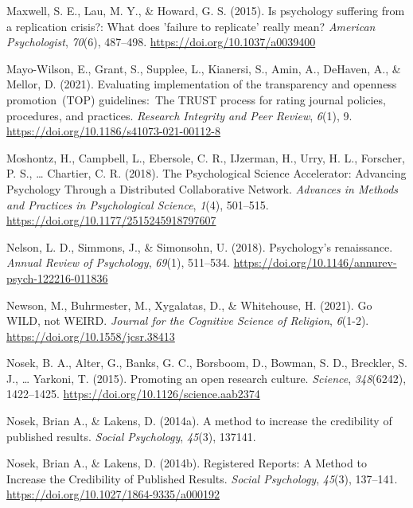 \documentclass[
  man,floatsintext]{apa6}
\newlength{\cslhangindent}
\newlength{\cslentryspacingunit} %
\newenvironment{CSLReferences}[2] %
 {%
  \setlength{\parindent}{0pt}
  \ifodd #1
  \let\oldpar\par
  \def\par{\hangindent=\cslhangindent\oldpar}
  \fi
  \setlength{\parskip}{#2\cslentryspacingunit}
 }%
 {}
\begin{document}
\begin{CSLReferences}{1}{0}
\leavevmode{}%
Maxwell, S. E., Lau, M. Y., \& Howard, G. S. (2015). Is psychology suffering from a replication crisis?: What does 'failure to replicate' really mean? \emph{American Psychologist}, \emph{70}(6), 487--498. \url{https://doi.org/10.1037/a0039400}

\leavevmode{}%
Mayo-Wilson, E., Grant, S., Supplee, L., Kianersi, S., Amin, A., DeHaven, A., \& Mellor, D. (2021). Evaluating implementation of the transparency and openness promotion~(TOP) guidelines:~The TRUST process for rating journal policies, procedures, and practices. \emph{Research Integrity and Peer Review}, \emph{6}(1), 9. \url{https://doi.org/10.1186/s41073-021-00112-8}

\leavevmode{}%
Moshontz, H., Campbell, L., Ebersole, C. R., IJzerman, H., Urry, H. L., Forscher, P. S., \ldots{} Chartier, C. R. (2018). The Psychological Science Accelerator: Advancing Psychology Through a Distributed Collaborative Network. \emph{Advances in Methods and Practices in Psychological Science}, \emph{1}(4), 501--515. \url{https://doi.org/10.1177/2515245918797607}

\leavevmode{}%
Nelson, L. D., Simmons, J., \& Simonsohn, U. (2018). Psychology's renaissance. \emph{Annual Review of Psychology}, \emph{69}(1), 511--534. \url{https://doi.org/10.1146/annurev-psych-122216-011836}

\leavevmode{}%
Newson, M., Buhrmester, M., Xygalatas, D., \& Whitehouse, H. (2021). Go WILD, not WEIRD. \emph{Journal for the Cognitive Science of Religion}, \emph{6}(1-2). \url{https://doi.org/10.1558/jcsr.38413}

\leavevmode{}%
Nosek, B. A., Alter, G., Banks, G. C., Borsboom, D., Bowman, S. D., Breckler, S. J., \ldots{} Yarkoni, T. (2015). Promoting an open research culture. \emph{Science}, \emph{348}(6242), 1422--1425. \url{https://doi.org/10.1126/science.aab2374}

\leavevmode{}%
Nosek, Brian A., \& Lakens, D. (2014a). A method to increase the credibility of published results. \emph{Social Psychology}, \emph{45}(3), 137141.

\leavevmode{}%
Nosek, Brian A., \& Lakens, D. (2014b). Registered Reports: A Method to Increase the Credibility of Published Results. \emph{Social Psychology}, \emph{45}(3), 137--141. \url{https://doi.org/10.1027/1864-9335/a000192}


\end{CSLReferences}
\end{document}
